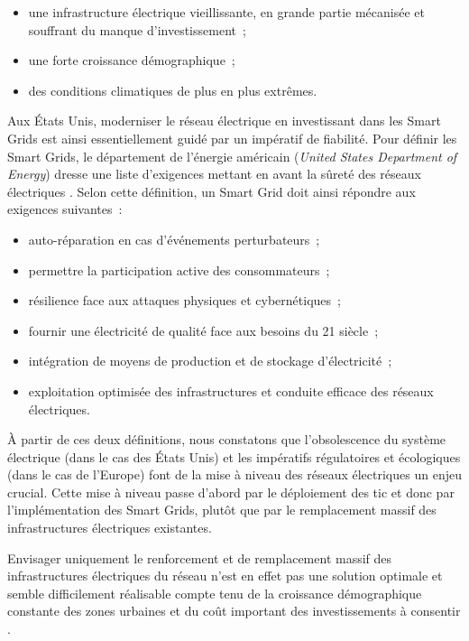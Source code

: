 \begin{itemize}
    \item une infrastructure électrique vieillissante, en grande partie
    mécanisée et souffrant du manque d'investissement~;
    \item une forte croissance démographique~;
    \item des conditions climatiques de plus en plus extrêmes.
\end{itemize}

Aux États Unis, moderniser le réseau électrique en investissant dans les Smart 
Grids est ainsi essentiellement guidé par un impératif de fiabilité. Pour 
définir les Smart Grids, le département de l'énergie américain (\textit{United 
States Department of Energy}) dresse une liste d'exigences mettant en avant la 
sûreté des réseaux électriques \cite{USDE}. Selon cette définition, un Smart Grid 
doit ainsi répondre aux exigences suivantes~:

\begin{itemize}
    \item auto-réparation en cas d'événements perturbateurs~;
    \item permettre la participation active des consommateurs~; 
    \item résilience face aux attaques physiques et cybernétiques~;
    \item fournir une électricité de qualité face aux besoins du 21
          siècle~;
    \item intégration de moyens de production et de stockage d'électricité~;
    \item exploitation optimisée des infrastructures et conduite efficace des 
réseaux électriques.
\end{itemize} 

À partir de ces deux définitions, nous constatons que l'obsolescence du système 
électrique (dans le cas des États Unis) et les impératifs régulatoires et 
écologiques (dans le cas de l'Europe) font de la mise à niveau des réseaux 
électriques un enjeu crucial. Cette mise à niveau passe d'abord par le 
déploiement des \gls{tic} et donc par l'implémentation des Smart Grids, plutôt 
que par le remplacement massif des infrastructures électriques existantes. 

Envisager uniquement le renforcement et de remplacement massif des 
infrastructures électriques du  réseau 
n'est en effet pas une solution optimale et semble difficilement réalisable 
compte tenu de la croissance démographique constante des zones urbaines et du 
coût important des investissements à consentir \cite{cre}.


